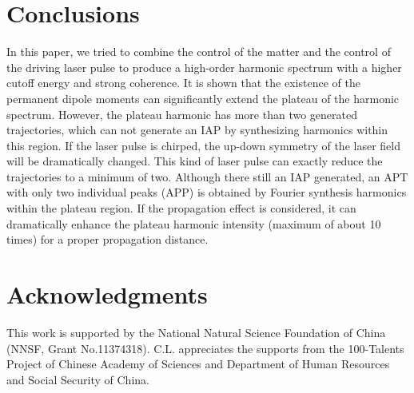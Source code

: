 \documentclass[10pt,letterpaper]{article}
\begin{document}


\section{Conclusions}
In this paper, we tried to combine the control of the matter and the control of the driving laser pulse to produce a high-order harmonic spectrum with a higher cutoff energy and strong coherence. It is shown that the existence of the permanent dipole moments can significantly extend the plateau of the harmonic spectrum. However, the plateau harmonic has more than two generated trajectories, which can not generate an IAP by synthesizing harmonics within this region. If the laser pulse is chirped, the up-down symmetry of the laser field will be dramatically changed. This kind of laser pulse can exactly reduce the trajectories to a minimum of two. Although there still an IAP generated, an APT with only two individual peaks (APP) is obtained by Fourier synthesis harmonics within the plateau region. If the propagation effect is considered, it can dramatically enhance the plateau harmonic intensity (maximum of about 10 times) for a proper propagation distance.

\section*{Acknowledgments}
This work is supported by the National Natural Science Foundation of China (NNSF, Grant
No.11374318). C.L. appreciates the supports from the 100-Talents Project of Chinese Academy
of Sciences and Department of Human Resources and Social Security of China.
\end{document}
